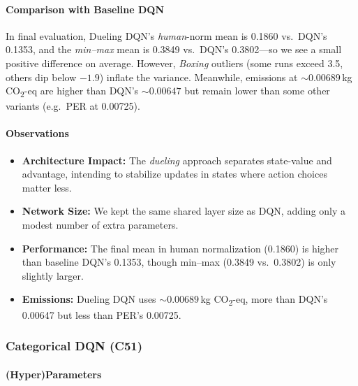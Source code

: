 \paragraph{Comparison with Baseline DQN}
In final evaluation, Dueling DQN’s \emph{human}-norm mean is 0.1860 vs.\ DQN’s 0.1353, 
and the \emph{min--max} mean is 0.3849 vs.\ DQN’s 0.3802—so we see a small positive difference on average.
However, \emph{Boxing} outliers (some runs exceed 3.5, others dip below $-1.9$) inflate the variance.
Meanwhile, emissions at $\sim0.00689$\,kg CO\textsubscript{2}-eq are higher than DQN’s $\sim0.00647$ but remain
lower than some other variants (e.g.\ PER at 0.00725).

\paragraph{Observations}
\begin{itemize}
	\item \textbf{Architecture Impact:}
	The \emph{dueling} approach separates state-value and advantage,
	intending to stabilize updates in states where action choices matter less.
	\item \textbf{Network Size:}
	We kept the same shared layer size as DQN, adding only a modest number of extra parameters.
	\item \textbf{Performance:}
	The final mean in human normalization (0.1860) is higher than baseline DQN’s 0.1353,
	though min--max (0.3849 vs.\ 0.3802) is only slightly larger.
	\item \textbf{Emissions:}
	Dueling DQN uses $\sim0.00689$\,kg CO\textsubscript{2}-eq,
	more than DQN’s 0.00647 but less than PER’s 0.00725.
\end{itemize}


\subsubsection{Categorical DQN (C51)}
\label{subsubsec:c51}

\paragraph{(Hyper)Parameters}

